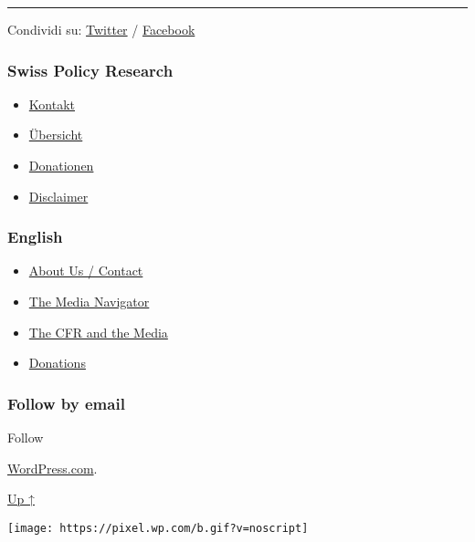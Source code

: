 \begin{center}\rule{0.5\linewidth}{\linethickness}\end{center}

Condividi su:
\href{https://twitter.com/intent/tweet?url=https://swprs.org/sur-le-coronavirus-les-medias-et-la-propagande/}{Twitter}
/
\href{https://www.facebook.com/share.php?u=https://swprs.org/sur-le-coronavirus-les-medias-et-la-propagande/}{Facebook}

\hypertarget{swiss-policy-research}{%
\subsubsection{Swiss Policy Research}\label{swiss-policy-research}}

\begin{itemize}
\tightlist
\item
  \href{https://swprs.org/kontakt/}{Kontakt}
\item
  \href{https://swprs.org/uebersicht/}{Übersicht}
\item
  \href{https://swprs.org/donationen/}{Donationen}
\item
  \href{https://swprs.org/disclaimer/}{Disclaimer}
\end{itemize}

\hypertarget{english}{%
\subsubsection{English}\label{english}}

\begin{itemize}
\tightlist
\item
  \href{https://swprs.org/contact/}{About Us / Contact}
\item
  \href{https://swprs.org/media-navigator/}{The Media Navigator}
\item
  \href{https://swprs.org/the-american-empire-and-its-media/}{The CFR
  and the Media}
\item
  \href{https://swprs.org/donations/}{Donations}
\end{itemize}

\hypertarget{follow-by-email}{%
\subsubsection{Follow by email}\label{follow-by-email}}

Follow

\href{https://wordpress.com/?ref=footer_custom_com}{WordPress.com}.

\protect\hyperlink{}{Up ↑}

\texttt{[image: https://pixel.wp.com/b.gif?v=noscript]}
